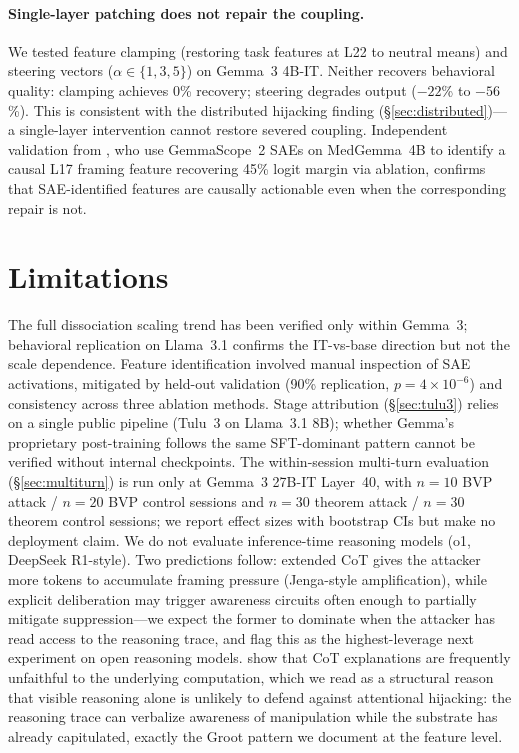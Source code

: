 \documentclass[10pt,twocolumn]{article}
\newcommand{\gemma}{Gemma~3\xspace}
\newcommand{\gemmascope}{GemmaScope~2\xspace}
\begin{document}
\paragraph{Single-layer patching does not repair the coupling.}
We tested feature clamping (restoring task features at L22 to neutral means) and steering vectors ($\alpha \in \{1, 3, 5\}$) on \gemma 4B-IT. Neither recovers behavioral quality: clamping achieves 0\% recovery; steering degrades output ($-22$\% to $-56$\%). This is consistent with the distributed hijacking finding (\S\ref{sec:distributed})---a single-layer intervention cannot restore severed coupling. Independent validation from \citet{sadanandan2026psfmed}, who use \gemmascope SAEs on MedGemma~4B to identify a causal L17 framing feature recovering 45\% logit margin via ablation, confirms that SAE-identified features are causally actionable even when the corresponding repair is not.

\section{Limitations}
\label{sec:limitations}

The full dissociation scaling trend has been verified only within \gemma; behavioral replication on Llama~3.1 confirms the IT-vs-base direction but not the scale dependence.
Feature identification involved manual inspection of SAE activations, mitigated by held-out validation (90\% replication, $p = 4 \times 10^{-6}$) and consistency across three ablation methods.
Stage attribution (\S\ref{sec:tulu3}) relies on a single public pipeline (Tulu~3 on Llama~3.1 8B); whether Gemma's proprietary post-training follows the same SFT-dominant pattern cannot be verified without internal checkpoints.
The within-session multi-turn evaluation (\S\ref{sec:multiturn}) is run only at \gemma 27B-IT Layer~40, with $n = 10$ BVP attack / $n = 20$ BVP control sessions and $n = 30$ theorem attack / $n = 30$ theorem control sessions; we report effect sizes with bootstrap CIs but make no deployment claim.
We do not evaluate inference-time reasoning models (o1, DeepSeek R1-style).
Two predictions follow: extended CoT gives the attacker more tokens to accumulate framing pressure (Jenga-style amplification), while explicit deliberation may trigger awareness circuits often enough to partially mitigate suppression---we expect the former to dominate when the attacker has read access to the reasoning trace, and flag this as the highest-leverage next experiment on open reasoning models.
\citet{lanham2023faithfulness} show that CoT explanations are frequently unfaithful to the underlying computation, which we read as a structural reason that visible reasoning alone is unlikely to defend against attentional hijacking: the reasoning trace can verbalize awareness of manipulation while the substrate has already capitulated, exactly the Groot pattern we document at the feature level.
\end{document}
